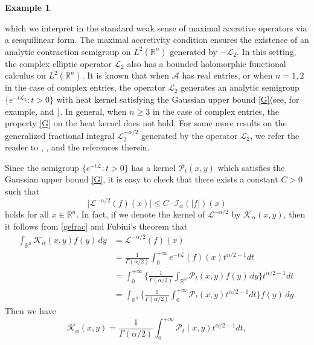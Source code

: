 \documentclass[10pt, reqno]{amsart}
\theoremstyle{definition}
\newtheorem{example}[theorem]{Example}
\theoremstyle{remark}
\numberwithin{equation}{section}
\begin{document}
\begin{example}
\begin{enumerate}
\begin{equation*}
\end{equation*}
which we interpret in the standard weak sense of maximal accretive operators via a sesquilinear form. The maximal accretivity condition ensures the existence of an analytic contraction semigroup on $L^2(\mathbb R^n)$ generated by $-\mathcal{L}_2$. In this setting, the complex elliptic operator $\mathcal{L}_2$ also has a bounded holomorphic functional calculus on $L^2(\mathbb R^n)$. It is known that when $\mathcal{A}$ has real entries, or when $n=1,2$ in the case of complex entries, the operator $\mathcal{L}_2$ generates an analytic semigroup $\big\{e^{-t\mathcal L_2}:t>0\big\}$ with heat kernel satisfying the Gaussian upper bound \eqref{G}(see, for example, \cite{d} and \cite{duong1}).
In general, when $n\geq3$ in the case of complex entries, the property
\eqref{G} on the heat kernel does not hold. For some more results on the generalized fractional integral $\mathcal{L}_2^{-\alpha/2}$ generated by the operator $\mathcal{L}_2$, we refer the reader to \cite{auscher2}, \cite{auscher}, \cite{chen} and the references therein.
\end{enumerate}
\end{example}
Since the semigroup $\big\{e^{-t\mathcal L}:t>0\big\}$ has a kernel $\mathcal{P}_t(x,y)$ which satisfies the Gaussian upper bound \eqref{G}, it is easy to check that there exists a constant $C>0$ such that
\begin{equation}\label{dominate1}
\big|\mathcal L^{-\alpha/2}(f)(x)\big|\leq C\cdot \mathcal{I}_{\alpha}(|f|)(x)
\end{equation}
holds for all $x\in\mathbb R^n$. In fact, if we denote the kernel of $\mathcal L^{-\alpha/2}$ by $\mathcal K_{\alpha}(x,y)$, then it follows from \eqref{gefrac} and Fubini's theorem that
\begin{equation*}
\begin{split}
\int_{\mathbb R^n}\mathcal K_{\alpha}(x,y)f(y)\,dy
&=\mathcal{L}^{-\alpha/2}(f)(x)\\
&=\frac{1}{\Gamma(\alpha/2)}\int_0^{+\infty}e^{-t\mathcal L}(f)(x)t^{\alpha/2-1}dt\\
&=\int_0^{+\infty}\bigg\{\frac{1}{\Gamma(\alpha/2)}\int_{\mathbb R^n}\mathcal{P}_t(x,y)f(y)\,dy\bigg\}t^{\alpha/2-1}dt\\
&=\int_{\mathbb R^n}\bigg\{\frac{1}{\Gamma(\alpha/2)}\int_0^{+\infty}\mathcal{P}_t(x,y)t^{\alpha/2-1}dt\bigg\}f(y)\,dy.
\end{split}
\end{equation*}
Then we have
\begin{equation}\label{kgamma}
\mathcal K_{\alpha}(x,y)=\frac{1}{\Gamma(\alpha/2)}\int_0^{+\infty}\mathcal{P}_t(x,y)t^{\alpha/2-1}dt,
\end{equation}
\end{document}
